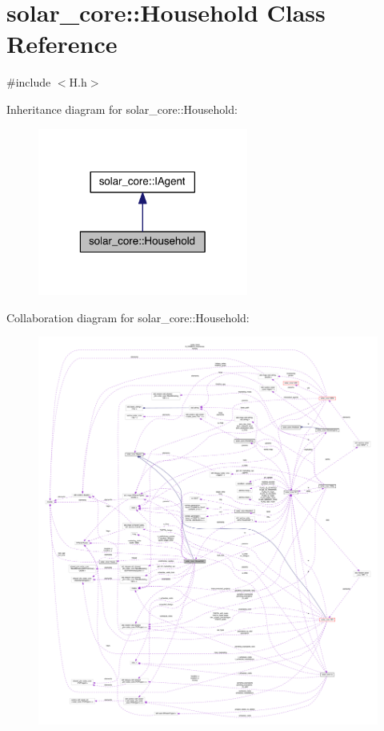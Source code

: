 \hypertarget{classsolar__core_1_1_household}{}\section{solar\+\_\+core\+:\+:Household Class Reference}
\label{classsolar__core_1_1_household}


{\ttfamily \#include $<$H.\+h$>$}



Inheritance diagram for solar\+\_\+core\+:\+:Household\+:\nopagebreak
\begin{figure}[H]
\begin{center}
\leavevmode
\includegraphics[width=196pt]{classsolar__core_1_1_household__inherit__graph}
\end{center}
\end{figure}


Collaboration diagram for solar\+\_\+core\+:\+:Household\+:
\nopagebreak
\begin{figure}[H]
\begin{center}
\leavevmode
\includegraphics[width=350pt]{classsolar__core_1_1_household__coll__graph}
\end{center}
\end{figure}

